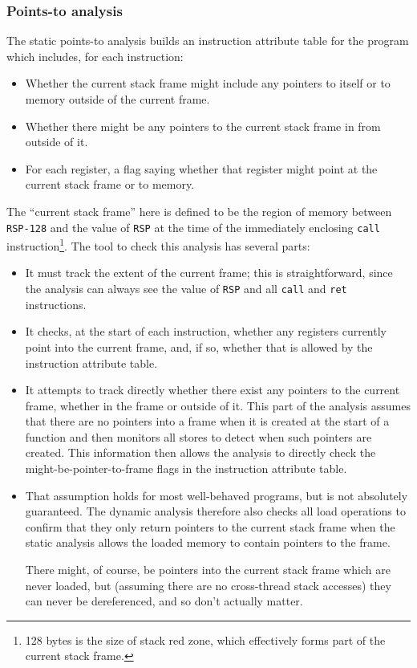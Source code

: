 \subsubsection{Points-to analysis}
\label{sect:eval:validate:pta}

The static points-to analysis builds an instruction attribute table
for the program which includes, for each instruction:

\begin{itemize}
\item
  Whether the current stack frame might include any pointers to itself
  or to memory outside of the current frame.
\item
  Whether there might be any pointers to the current stack frame in
  from outside of it.
\item
  For each register, a flag saying whether that register might point
  at the current stack frame or to memory.
\end{itemize}

The ``current stack frame'' here is defined to be the region of memory
between \verb|RSP-128| and the value of \verb|RSP| at the time of the
immediately enclosing \verb|call| instruction\footnote{128 bytes is
the size of stack red zone, which effectively forms part of the
current stack frame.}.  The tool to check this analysis
has several parts:

\begin{itemize}
\item
  It must track the extent of the current frame; this is
  straightforward, since the analysis can always see the value
  of \verb|RSP| and all \verb|call| and \verb|ret| instructions.
\item
  It checks, at the start of each instruction, whether any registers
  currently point into the current frame, and, if so, whether that is
  allowed by the instruction attribute table.
\item
  It attempts to track directly whether there exist any pointers to
  the current frame, whether in the frame or outside of it.  This part
  of the analysis assumes that there are no pointers into a frame when
  it is created at the start of a function and then monitors all
  stores to detect when such pointers are created.  This information
  then allows the analysis to directly check the
  might-be-pointer-to-frame flags in the instruction attribute table.
\item
  That assumption holds for most well-behaved programs, but is not
  absolutely guaranteed.  The dynamic analysis therefore also checks
  all load operations to confirm that they only return pointers to the
  current stack frame when the static analysis allows the loaded
  memory to contain pointers to the frame.

  There might, of course, be pointers into the current stack frame
  which are never loaded, but (assuming there are no cross-thread
  stack accesses) they can never be dereferenced, and so don't
  actually matter.
\end{itemize}

